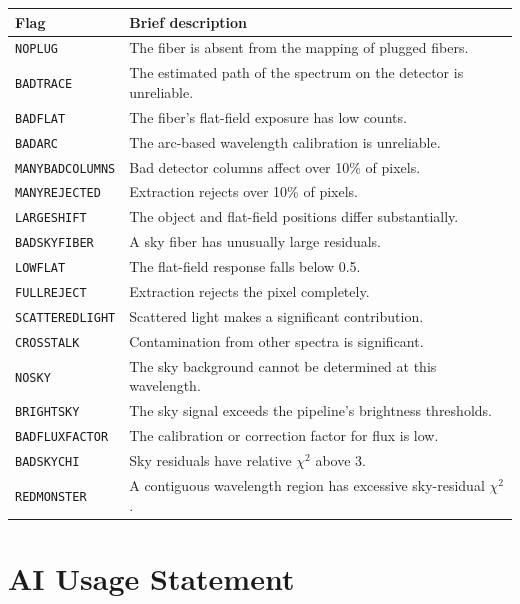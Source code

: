 \documentclass[12pt,a4paper]{article}
\begin{document}
\begin{table}[htbp]
\centering
\small
\begin{tabular}{@{}p{4.2cm}p{10.8cm}@{}}
\toprule
Flag & Brief description \\
\midrule
\texttt{NOPLUG} & The fiber is absent from the mapping of plugged fibers. \\
\texttt{BADTRACE} & The estimated path of the spectrum on the detector is unreliable. \\
\texttt{BADFLAT} & The fiber's flat-field exposure has low counts. \\
\texttt{BADARC} & The arc-based wavelength calibration is unreliable. \\
\texttt{MANYBADCOLUMNS} & Bad detector columns affect over 10\% of pixels. \\
\texttt{MANYREJECTED} & Extraction rejects over 10\% of pixels. \\
\texttt{LARGESHIFT} & The object and flat-field positions differ substantially. \\
\texttt{BADSKYFIBER} & A sky fiber has unusually large residuals. \\
\texttt{LOWFLAT} & The flat-field response falls below 0.5. \\
\texttt{FULLREJECT} & Extraction rejects the pixel completely. \\
\texttt{SCATTEREDLIGHT} & Scattered light makes a significant contribution. \\
\texttt{CROSSTALK} & Contamination from other spectra is significant. \\
\texttt{NOSKY} & The sky background cannot be determined at this wavelength. \\
\texttt{BRIGHTSKY} & The sky signal exceeds the pipeline's brightness thresholds. \\
\texttt{BADFLUXFACTOR} & The calibration or correction factor for flux is low. \\
\texttt{BADSKYCHI} & Sky residuals have relative $\chi^2$ above 3. \\
\texttt{REDMONSTER} & A contiguous wavelength region has excessive sky-residual $\chi^2$. \\
\bottomrule
\end{tabular}
\end{table}

\clearpage
\section*{AI Usage Statement}
\end{document}
